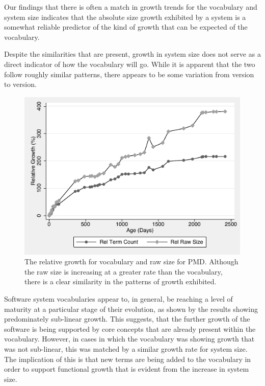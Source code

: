 
Our findings that there is often a match in growth trends for the vocabulary and system size indicates that the absolute size growth exhibited by a system is a somewhat reliable predictor of the kind of growth that can be expected of the vocabulary.


Despite the similarities that are present, growth in system size does not serve as a direct indicator of how the vocabulary will go. While it is apparent that the two follow roughly similar patterns, there appears to be some variation from version to version.

\begin{figure}[t]
\centering
\includegraphics[width=\textwidth]{Figures/Vocab-PMDComparativeGrowth.pdf}
\caption{The relative growth for vocabulary and raw size for PMD. Although the raw size is increasing at a greater rate than the vocabulary, there is a clear similarity in the patterns of growth exhibited.}
\label{fig:comparative_growth_pmd}
\end{figure}

Software system vocabularies appear to, in general, be reaching a level of maturity at a particular stage of their evolution, as shown by the results showing predominately sub-linear growth. This suggests, that the further growth of the software is being supported by core concepts that are already present within the vocabulary. However, in cases in which the vocabulary was showing growth that was not sub-linear, this was matched by a similar growth rate for system size. The implication of this is that new terms are being added to the vocabulary in order to support functional growth that is evident from the increase in system size.

